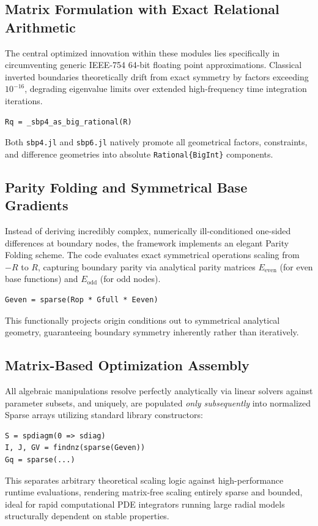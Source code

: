 \documentclass[reprint,amsmath,amssymb,aps]{revtex4-2}
\begin{document}
\subsection{Matrix Formulation with Exact Relational Arithmetic}
The central optimized innovation within these modules lies specifically in circumventing generic IEEE-754 64-bit floating point approximations. Classical inverted boundaries theoretically drift from exact symmetry by factors exceeding $10^{-16}$, degrading eigenvalue limits over extended high-frequency time integration iterations.
\begin{verbatim}
Rq = _sbp4_as_big_rational(R)
\end{verbatim}
Both \texttt{sbp4.jl} and \texttt{sbp6.jl} natively promote all geometrical factors, constraints, and difference geometries into absolute \texttt{Rational\{BigInt\}} components.

\subsection{Parity Folding and Symmetrical Base Gradients}
Instead of deriving incredibly complex, numerically ill-conditioned one-sided differences at boundary nodes, the framework implements an elegant Parity Folding scheme. The code evaluates exact symmetrical operations scaling from $-R$ to $R$, capturing boundary parity via analytical parity matrices $E_{\text{even}}$ (for even base functions) and $E_{\text{odd}}$ (for odd nodes).
\begin{verbatim}
Geven = sparse(Rop * Gfull * Eeven)
\end{verbatim}
This functionally projects origin conditions out to symmetrical analytical geometry, guaranteeing boundary symmetry inherently rather than iteratively.

\subsection{Matrix-Based Optimization Assembly}
All algebraic manipulations resolve perfectly analytically via linear solvers against parameter subsets, and uniquely, are populated \textit{only subsequently} into normalized Sparse arrays utilizing standard library constructors:
\begin{verbatim}
S = spdiagm(0 => sdiag)
I, J, GV = findnz(sparse(Geven))
Gq = sparse(...)
\end{verbatim}
This separates arbitrary theoretical scaling logic against high-performance runtime evaluations, rendering matrix-free scaling entirely sparse and bounded, ideal for rapid computational PDE integrators running large radial models structurally dependent on stable properties.
\end{document}
